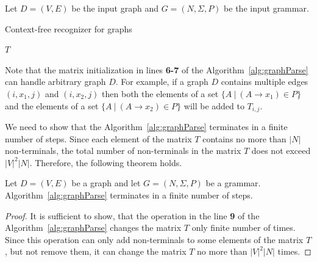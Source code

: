 \documentclass[runningheads,a4paper]{llncs}
\begin{document}
Let $D = (V, E)$ be the input graph and $G = (N,\Sigma,P)$ be the input grammar.

\begin{algorithm}[H]
	\begin{algorithmic}[1]
		\caption{Context-free recognizer for graphs}
		\label{alg:graphParse}
		
		\EndFor    
		
		\EndWhile
		\State \Return $T$
		\EndFunction
	\end{algorithmic}
\end{algorithm}

Note that the matrix initialization in lines \textbf{6-7} of the Algorithm~\ref{alg:graphParse} can handle arbitrary graph $D$. For example, if a graph $D$ contains multiple edges $(i,x_1,j)$ and $(i,x_2,j)$ then both the elements of a set $\{A~|~(A \rightarrow x_1) \in P \}$ and the elements of a set $\{A~|~(A \rightarrow x_2) \in P \}$ will be added to $T_{i,j}$.

We need to show that the Algorithm~\ref{alg:graphParse} terminates in a finite number of steps. Since each element of the matrix $T$ contains no more than $|N|$ non-terminals, the total number of non-terminals in the matrix $T$ does not exceed $|V|^2|N|$. Therefore, the following theorem holds.

\begin{mytheorem}\label{thm:finite}
	Let $D = (V,E)$ be a graph and let $G =(N,\Sigma,P)$ be a grammar. Algorithm~\ref{alg:graphParse} terminates in a finite number of steps. 
\end{mytheorem}
\begin{proof}
	It is sufficient to show, that the operation in the line \textbf{9} of the Algorithm~\ref{alg:graphParse} changes the matrix $T$ only finite number of times. Since this operation can only add non-terminals to some elements of the matrix $T$, but not remove them, it can change the matrix $T$ no more than $|V|^2|N|$ times.
\end{proof}
\end{document}
